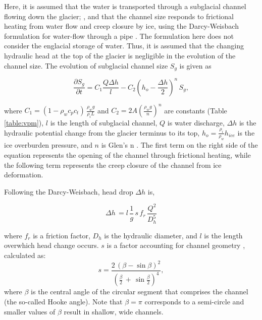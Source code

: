 \documentclass[11pt]{article}
\begin{document}
Here, it is assumed that the water is transported through a subglacial channel flowing down the glacier; \citep[Figure~\ref{fig:cartoon}; ][]{rothlisberger1972}, and that the channel  size responds to frictional heating from water flow and creep closure by ice, using the Darcy-Weisbach formulation for water-flow through a pipe  \citep[e.g.][]{rothlisberger1972,clarke2003}.
The formulation here does not consider the englacial storage of water.
Thus, it is assumed that the changing hydraulic head at the top of the glacier is negligible in the evolution of the channel size. 
The evolution of subglacial channel size $S_g$ is given as
\begin{linenomath*}
  \begin{equation}
    \label{eq:dS_dt}
    \frac{\partial S_g}{\partial t} = C_1 \frac{Q \Delta h}{l} - C_2 (h_{o}-\frac{\Delta h}{2})^n\,S_g,
  \end{equation}
\end{linenomath*}
\noindent where $C_1= (1-\rho_wc_pc_t)\,\frac{\rho_wg}{\rho_iL}$ and $C_2=2A(\frac{\rho_wg}{n})^n$ are constants (Table \ref{table:vpm}), $l$ is the length of subglacial channel, $Q$ is water discharge, $\Delta h$ is the hydraulic potential change from the glacier terminus to its top, $h_{o}= \frac{\rho_i}{\rho_w} h_{ice}$ is the ice overburden pressure, and $n$ is Glen's n \citep{glen1955}.
The first term on the right side of the equation represents the opening of the channel through frictional heating, while the following term represents the creep closure of the channel from ice deformation. 


Following the Darcy-Weisbach, head drop $\Delta h$ is,
\begin{linenomath*}
  \begin{equation}
    \label{eq:dh}
    \Delta h \,  = l \,\frac{1}{g}\,s\,f_r\,\frac{Q^2}{D_h^5}
  \end{equation}
\end{linenomath*}
\noindent where $f_r$ is a friction factor, $D_h$ is the hydraulic diameter, and $l$ is the length overwhich head change occurs. $s$ is a factor accounting for channel geometry \citep{hooke1990}, calculated as:
\begin{equation}
  \label{eq:Hf}
  s = \frac{2\,(\beta -\sin \beta)^2}{(\frac{\beta}{2}\,+\,\sin \frac{\beta}{2})^4},
\end{equation}
where $\beta$ is the central angle of the circular segment that comprises the channel (the so-called Hooke angle). Note that $\beta =\pi$ corresponds to a semi-circle and
smaller values of $\beta$ result in shallow, wide channels.
\end{document}
